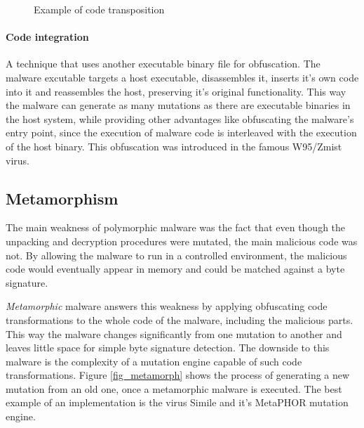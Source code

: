\begin{figure}[H]
    \centering
    \caption{Example of code transposition}
    \label{fig_obf_trans}
\end{figure}

\paragraph*{Code integration}
A technique that uses another executable binary file for obfuscation. The malware excutable targets a host executable, disassembles it, inserts it's own code into it and reassembles the host, preserving it's original functionality. This way the malware can generate as many mutations as there are executable binaries in the host system, while providing other advantages like obfuscating the malware's entry point, since the execution of malware code is interleaved with the execution of the host binary. This obfuscation was introduced in the famous W95/Zmist virus.

\subsection{Metamorphism}
The main weakness of polymorphic malware was the fact that even though the unpacking and decryption procedures were mutated, the main malicious code was not. By allowing the malware to run in a controlled environment, the malicious code would eventually appear in memory and could be matched against a byte signature.

\emph{Metamorphic} malware answers this weakness by applying obfuscating code transformations to the whole code of the malware, including the malicious parts. This way the malware changes significantly from one mutation to another and leaves little space for simple byte signature detection. The downside to this malware is the complexity of a mutation engine capable of such code transformations. Figure \ref{fig_metamorph} shows the process of generating a new mutation from an old one, once a metamorphic malware is executed. The best example of an implementation is the virus Simile and it's MetaPHOR mutation engine.

